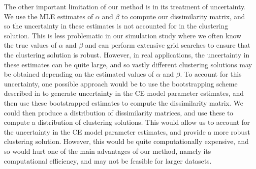 \documentclass[
  12pt]{article}
\DeclareMathOperator{\CE}{\mathrm{CE}}
\begin{document}
The other important limitation of our method is in its treatment of uncertainty. 
We use the MLE estimates of $\alpha$ and $\beta$ to compute our dissimilarity matrix, and so the uncertainty in these estimates is not accounted for in the clustering solution.
This is less problematic in our simulation study where we often know the true values of $\alpha$ and $\beta$ and can perform extensive grid searches to ensure that the clustering solution is robust.
However, in real applications, the uncertainty in these estimates can be quite large, and so vastly different clustering solutions may be obtained depending on the estimated values of $\alpha$ and $\beta$.
To account for this uncertainty, one possible approach would be to use the bootstrapping scheme described in \citet{Heffernan2004} to generate uncertainty in the CE model parameter estimates, and then use these bootstrapped estimates to compute the dissimilarity matrix.
We could then produce a distribution of dissimilarity matrices, and use these to compute a distribution of clustering solutions.
This would allow us to account for the uncertainty in the CE model parameter estimates, and provide a more robust clustering solution.
However, this would be quite computationally expensive, and so would hurt one of the main advantages of our method, namely its computational efficiency, and may not be feasible for larger datasets.


\end{document}
